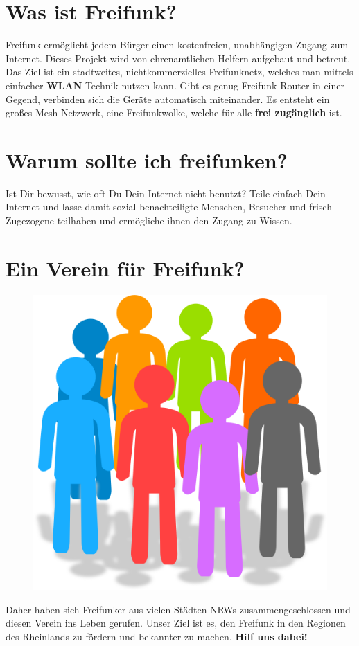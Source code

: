 \documentclass[10pt]{scrartcl}
\begin{document}
\section{\normalsize Was ist Freifunk?}
Freifunk ermöglicht jedem Bürger einen kostenfreien, unabhängigen Zugang zum Internet. Dieses Projekt wird von ehrenamtlichen Helfern aufgebaut und betreut. Das Ziel ist ein stadtweites, nichtkommerzielles Freifunknetz, welches man mittels einfacher \textbf{WLAN}-Technik nutzen kann. Gibt es genug Freifunk-Router in einer Gegend, verbinden sich die Geräte automatisch miteinander. Es entsteht ein großes Mesh-Netzwerk, eine \glqq Freifunkwolke\grqq, welche für alle \textbf{frei zugänglich} ist.

\section{\normalsize Warum sollte ich freifunken?}
Ist Dir bewusst, wie oft Du Dein Internet nicht benutzt? Teile einfach Dein Internet und lasse damit sozial benachteiligte Menschen, Besucher und frisch Zugezogene teilhaben und ermögliche ihnen den Zugang zu Wissen.

\section{\normalsize Ein Verein für Freifunk?}
\begin{figure}
\includegraphics[scale=0.2]{Verein}
\end{figure}
Daher haben sich Freifunker aus vielen Städten NRWs zusammengeschlossen und diesen Verein ins Leben gerufen.
Unser Ziel ist es, den Freifunk in den Regionen des Rheinlands zu fördern und bekannter zu machen.
\textbf{Hilf uns dabei!}
\end{document}
